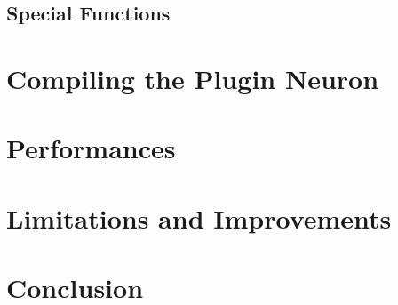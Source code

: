 \documentclass{article}
\begin{document}
\subsection{Special Functions}

\section{Compiling the Plugin Neuron}

\section{Performances}

\section{Limitations and Improvements}

\section{Conclusion}
\end{document}
